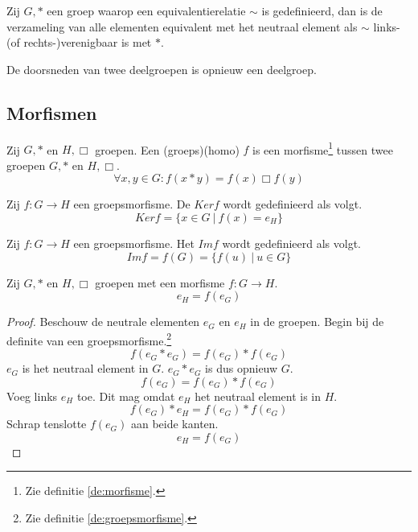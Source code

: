 \documentclass[main.tex]{subfiles}
\begin{document}
\begin{st}
  Zij $G,*$ een groep waarop een equivalentierelatie $\sim$ is gedefinieerd, dan is de verzameling van alle elementen equivalent met het neutraal element als $\sim$ links-(of rechts-)verenigbaar is met $*$.
  
\end{st}

\begin{st}
  \label{st:doorsnede-deelgroepen}
  De doorsneden van twee deelgroepen is opnieuw een deelgroep.
\end{st}

\subsection{Morfismen}
\label{sec:morfismen}

\begin{de}
  \label{de:groepsmorfisme}
  Zij $G,*$ en $H,\Box$ groepen.
  Een (groeps)(homo) $f$ is een morfisme\footnote{Zie definitie \ref{de:morfisme}.} tussen twee groepen $G,*$ en $H,\Box$.
  \[ \forall x,y \in G: f(x*y) = f(x) \Box f(y) \]
\end{de}

\begin{de}
  Zij $f: G \rightarrow H$ een groepsmorfisme. De  $Ker f$ wordt gedefinieerd als volgt.
  \[ Ker f = \{ x \in G \ |\ f(x) = e_{H} \} \]
\end{de}

\begin{de}
  Zij $f: G \rightarrow H$ een groepsmorfisme. Het  $Im f$ wordt gedefinieerd als volgt.
  \[ Im f = f(G) = \{ f(u) \ |\ u \in G \} \]
\end{de}


\begin{st}
  \label{st:groepsmorfisme-behoudt-neutraal-element}
  Zij $G,*$ en $H,\Box$ groepen met een morfisme $f: G \rightarrow H$.
  \[ e_{H} = f(e_{G}) \]

  \begin{proof}
    Beschouw de neutrale elementen $e_{G}$ en $e_{H}$ in de groepen.
    Begin bij de definite van een groepsmorfisme.\footnote{Zie definitie \ref{de:groepsmorfisme}.}
    \[ f(e_{G}*e_{G}) = f(e_{G})*f(e_{G}) \]
    $e_{G}$ is het neutraal element in $G$. $e_{G}*e_{G}$ is dus opnieuw $G$.
    \[ f(e_{G}) = f(e_{G})*f(e_{G}) \]
    Voeg links $e_{H}$ toe. Dit mag omdat $e_{H}$ het neutraal element is in $H$.
    \[ f(e_{G})*e_{H} = f(e_{G})*f(e_{G}) \]
    Schrap tenslotte $f(e_{G})$ aan beide kanten.
    \[ e_{H} = f(e_{G}) \]
  \end{proof}
\end{st}
\end{document}
